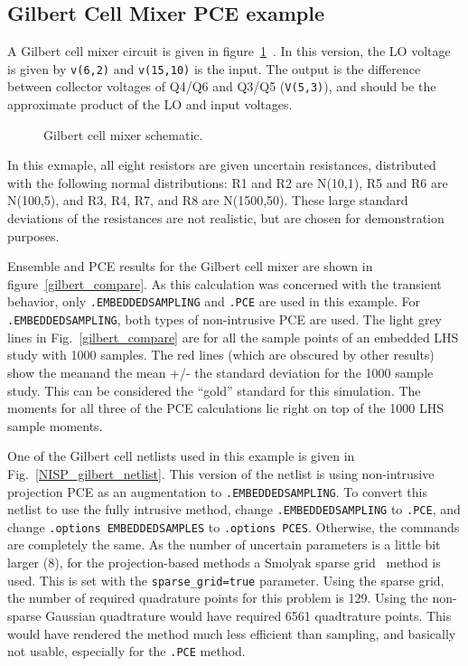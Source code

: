 \subsection{Gilbert Cell Mixer PCE example}
\label{xyceGilbertCell}
A Gilbert cell mixer circuit is given in figure~\ref{gilbert}~\cite{1049925}.
In this version, the LO voltage is given by \texttt{v(6,2)} and \texttt{v(15,10)} is the input. 
The output is the difference between collector voltages of Q4/Q6 and Q3/Q5 (\texttt{V(5,3)}), 
and should be the approximate product of the LO and input voltages.
\begin{figure}[hbt]
\centering
\resizebox{.9\linewidth}{!}{ }
  \caption[Gilbert cell mixer schematic]
  {Gilbert cell mixer schematic.}
\label{gilbert}
\end{figure}
In this exmaple, all eight 
resistors are given uncertain resistances, distributed with the following normal distributions:  R1 and R2 are N(10,1), 
R5 and R6 are N(100,5), and R3, R4, R7, and R8 are N(1500,50).  These large standard deviations of the resistances are 
not realistic, but are chosen for demonstration purposes.

Ensemble and PCE results for the Gilbert cell mixer are shown in figure~\ref{gilbert_compare}.   
As this calculation was concerned with the transient behavior, only \texttt{.EMBEDDEDSAMPLING} 
and \texttt{.PCE} are used in this example.  For \texttt{.EMBEDDEDSAMPLING}, both types of 
non-intrusive PCE are used.
The light grey lines in Fig.~\ref{gilbert_compare} are for all the sample points 
of an embedded LHS study with 1000 samples.    The red lines (which are obscured 
by other results) show the meanand the mean +/- the standard deviation for the 
1000 sample study.  This can be considered the ``gold'' standard for this simulation.
The moments for all three of the \Xyce{} PCE calculations lie right on top of the 
1000 LHS sample moments.  

One of the Gilbert cell netlists used in this example is given in Fig.~\ref{NISP_gilbert_netlist}.  This version of the netlist
is using non-intrusive projection PCE as an augmentation to \texttt{.EMBEDDEDSAMPLING}.  To convert this netlist to 
use the fully intrusive method, change \texttt{.EMBEDDEDSAMPLING} to \texttt{.PCE}, and 
change \texttt{.options EMBEDDEDSAMPLES} to \texttt{.options PCES}.   Otherwise, the commands are completely the same.
As the number of uncertain parameters is a little bit larger (8), for the projection-based methods a 
Smolyak sparse grid~\cite{Smolyak_63} method is used.  This is set with the  \texttt{sparse\_grid=true} parameter. 
Using the sparse grid, the number of 
required quadrature points for this problem is 129.  Using the non-sparse Gaussian quadtrature 
would have required 6561 quadtrature points. This would have rendered the method much 
less efficient than sampling, and basically not usable, especially for the \texttt{.PCE} method.

